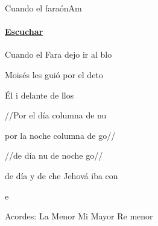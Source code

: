 \documentclass[12pt, spanish]{book}
\newcommand{\NotCCLIed}{\relax}
\begin{document}
    \begin{song}{Cuando el faraón}{Am}
    {} %
    {}
    {} %
    {} %
        \ifChordBk
        \paragraph{\mbox{}\hfill\protect\href{https://open.spotify.com/intl-es/track/7d9octtaLHlthSl7AlZMqJ}{Escuchar}\mbox{}\hfill}
        \fi

        \begin{SBOpGroup}
            Cuando el Fara dejo ir al blo

            Moisés les guió por el deto
        \end{SBOpGroup}

        \begin{SBOpGroup}
            Él i delante de llos
        \end{SBOpGroup}

        \begin{SBChorus}
            //Por el día columna de nu

            por la noche columna de go//

            //de día nu de noche go//
        \end{SBChorus}

        \begin{SBOpGroup}
            de día y de che Jehová iba con

            e
        \end{SBOpGroup}

        \ifChordBk
        \begin{SBOpGroup}
            Acordes:
            \upchord{\Am}\qquad La Menor \hfill
            \upchord{\E}\qquad Mi Mayor \hfill\null\break
            \upchord{\Dm}Re menor \hfill
        \end{SBOpGroup}
        \fi
    \end{song}
\end{document}

